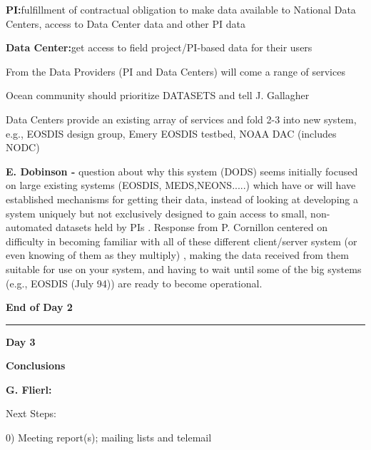\begin{description}


{\bf PI:}\quad fulfillment of contractual obligation to make data available
to National Data Centers, \quad access to Data Center data and other PI data

{\bf Data Center:}\quad get access to field project/PI-based data for their
users 


From the Data Providers (PI and Data Centers) will come a range of 
services


Ocean community should prioritize DATASETS and tell J. Gallagher
\smallskip

Data Centers provide an existing array of services and fold 2-3 into new 
system, e.g., EOSDIS design group, Emery EOSDIS testbed, NOAA DAC  
(includes NODC)


{\bf E. Dobinson -} question about why this system (DODS)  seems initially 
focused on large existing systems (EOSDIS, MEDS,NEONS.....) which have or 
will have established mechanisms for getting their data, instead of 
looking at developing a system uniquely but not exclusively designed to 
gain access to small, non-automated datasets held by PIs .  Response from 
P. Cornillon centered on difficulty in becoming familiar with all of these 
different client/server system (or even knowing of them as they multiply) 
, making the data received from them suitable for use on your system, and 
having to wait until some of the big systems (e.g., EOSDIS (July 94)) are 
ready to become operational. 
\medskip
\begin{center}
{\bf End of Day 2}
\end{center}
\bigskip
\bigskip
\begin{latexonly}
\vskip4pt\hrule height2pt\smallskip

\end{latexonly}\bigskip
\Large
\begin{center}
{\bf Day 3}
\end{center}
\begin{center}
{\bf Conclusions}
\end{center}
\normalsize
\medskip
{\bf G. Flierl:}

\noindent Next Steps:
\begin{description}
	\item{0)}  Meeting report(s); mailing lists and telemail


\end{description}
\end{description}
